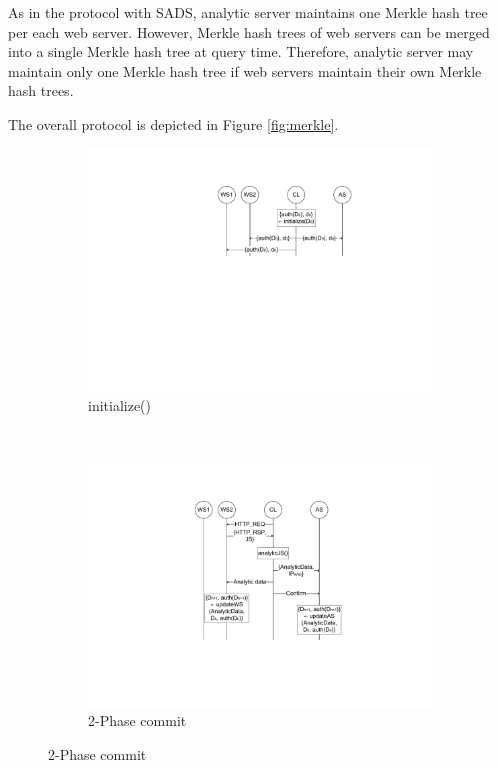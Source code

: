 As in the protocol with SADS, analytic server maintains one Merkle hash tree per each web server. 
However, Merkle hash trees of web servers can be merged into a single Merkle hash tree at query time. 
Therefore, analytic server may maintain only one Merkle hash tree if web servers maintain their own Merkle hash trees.

The overall protocol is depicted in Figure \ref{fig:merkle}.

\begin{figure}
        \centering
        \begin{subfigure}[t]{0.495\textwidth}
                \centering
                \includegraphics[width=\textwidth]{figure/merkle_1.pdf}
                \caption{initialize()}
                \label{fig:merkle_1}
        \end{subfigure}%
        ~ %
        \begin{subfigure}[t]{0.495\textwidth}
                \centering
                \includegraphics[width=\textwidth]{figure/merkle_2.pdf}
                \caption{2-Phase commit}
                \label{fig:merkle_2}
        \end{subfigure}
	\newline


\end{figure}
